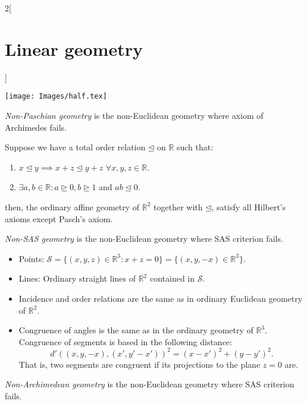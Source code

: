 \documentclass[class=article,10pt,crop=false]{standalone}
\begin{document}
\begin{multicols}{2}[\section{Linear geometry}]
\begin{definition}
\begin{itemize}
\begin{minipage}{\linewidth}
        \centering
        \texttt{[image: Images/half.tex]} 
    \end{minipage} 
\end{itemize}
\end{definition}
\begin{definition}
\textit{Non-Paschian geometry} is the non-Euclidean geometry where axiom of Archimedes fails.
\end{definition}
\begin{prop}
Suppose we have a total order relation $\unlhd$ on $\mathbb{R}$ such that:
\begin{enumerate}
    \item $x\unlhd y\implies x+z\unlhd y+z$ $\forall x,y,z\in\mathbb{R}$.
    \item $\exists a,b\in\mathbb{R}: a\unrhd 0, b\unrhd 1$ and $ab\unlhd 0$.
\end{enumerate}
then, the ordinary affine geometry of $\mathbb{R}^2$ together with $\unlhd$, satisfy all Hilbert's axioms except Pasch's axiom.
\end{prop}
\begin{definition}
\textit{Non-SAS geometry} is the non-Euclidean geometry where SAS criterion fails.
\end{definition}
\begin{prop}
\hfill
\begin{itemize}
    \item Points: $\mathcal{S}=\{(x,y,z)\in\mathbb{R}^3:x+z=0\}=\{(x,y,-x)\in\mathbb{R}^3\}$.
    \item Lines: Ordinary straight lines of $\mathbb{R}^2$ contained in $\mathcal{S}$.
    \item Incidence and order relations are the same as in ordinary Euclidean geometry of $\mathbb{R}^2$.
    \item Congruence of angles is the same as in the ordinary geometry of $\mathbb{R}^3$. Congruence of segments is based in the following distance:  $$d'((x,y,-x),(x',y'-x'))^2=(x-x')^2+(y-y')^2.$$ That is, two segments are congruent if its projections to the plane $z=0$ are.
\end{itemize}
\end{prop}
\begin{definition}
\textit{Non-Archimedean geometry} is the non-Euclidean geometry where SAS criterion fails.
\end{definition}

\end{multicols}
\end{document}
